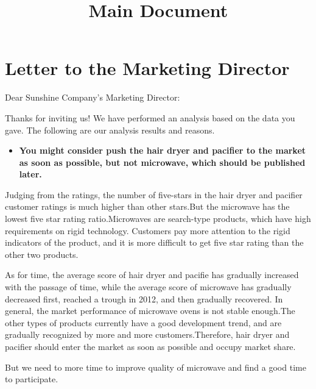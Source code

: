 \documentclass[12pt,a4paper,]{article}
\title{Main Document}
\author{}
\date{}
\providecommand{\tightlist}{%
  \setlength{\itemsep}{0pt}\setlength{\parskip}{0pt}}
\begin{document}
\maketitle

\newpage

\setcounter{page}{1}

\tableofcontents

\newpage

\hypertarget{letter-to-the-marketing-director}{%
\section*{Letter to the Marketing
Director}\label{letter-to-the-marketing-director}}

Dear Sunshine Company's Marketing Director:

Thanks for inviting us! We have performed an analysis based on the data
you gave. The following are our analysis results and reasons.

\begin{itemize}
\tightlist
\item
  \textbf{You might consider push the hair dryer and pacifier to the
  market as soon as possible, but not microwave, which should be
  published later.}
\end{itemize}

Judging from the ratings, the number of five-stars in the hair dryer and
pacifier customer ratings is much higher than other stars.But the
microwave has the lowest five star rating ratio.Microwaves are
search-type products, which have high requirements on rigid technology.
Customers pay more attention to the rigid indicators of the product, and
it is more difficult to get five star rating than the other two
products.

As for time, the average score of hair dryer and pacifie has gradually
increased with the passage of time, while the average score of microwave
has gradually decreased first, reached a trough in 2012, and then
gradually recovered. In general, the market performance of microwave
ovens is not stable enough.The other types of products currently have a
good development trend, and are gradually recognized by more and more
customers.Therefore, hair dryer and pacifier should enter the market as
soon as possible and occupy market share.

But we need to more time to improve quality of microwave and find a good
time to participate.
\end{document}
